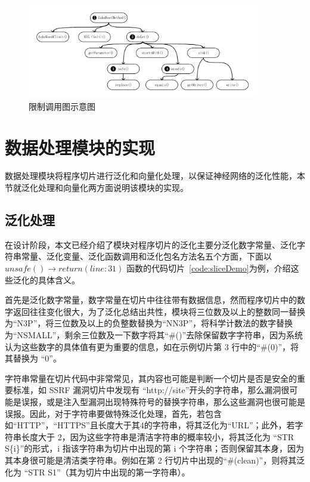 \begin{figure}[!htb]
    \centering
    \includegraphics[width=0.9\textwidth]{FIGs/chapter4/prune.pdf}
    \caption{限制调用图示意图}\label{prune}
\end{figure}


\section{数据处理模块的实现}

数据处理模块将程序切片进行泛化和向量化处理，以保证神经网络的泛化性能，本节就泛化处理和向量化两方面说明该模块的实现。\\

\subsection{泛化处理}

在设计阶段，本文已经介绍了模块对程序切片的泛化主要分泛化数字常量、泛化字符串常量、泛化变量、泛化函数调用和泛化包名方法名五个方面，下面以 $unsafe() \rightarrow return(line:31)$ 函数的代码切片~\ref{code:sliceDemo}为例，介绍这些泛化的具体含义。

\begin{minipage}[!htbp]{0.9\textwidth}
    
\end{minipage}

首先是泛化数字常量，数字常量在切片中往往带有数据信息，然而程序切片中的数字返回往往变化很大，为了泛化总结出共性，模块将三位数及以上的整数同一替换为“N3P”，将三位数及以上的负整数替换为“NN3P”，将科学计数法的数字替换为“NSMALL”，剩余三位数及一下数字将其“\#()”去除保留数字字符串，因为系统认为这些数字的具体值有更为重要的信息，如在示例切片第 3 行中的“\#(0)”，将其替换为 “0”。

字符串常量在切片代码中非常常见，其内容也可能是判断一个切片是否是安全的重要标准，如 SSRF 漏洞切片中发现有 “http://site”开头的字符串，那么漏洞很可能是误报，或是注入型漏洞出现特殊符号的替换字符串，那么这些漏洞也很可能是误报。因此，对于字符串要做特殊泛化处理，首先，若包含如“HTTP”，“HTTPS”且长度大于其4的字符串，将其泛化为“URL”；此外，若字符串长度大于 2，因为这些字符串是清洁字符串的概率较小，将其泛化为 “STR S\{i\}”的形式，i 指该字符串为切片中出现的第 i 个字符串；否则保留其本身，因为其本身很可能是清洁类字符串。例如在第 2 行切片中出现的“\#(clean)”，则将其泛化为 “STR S1”（其为切片中出现的第一字符串）。

